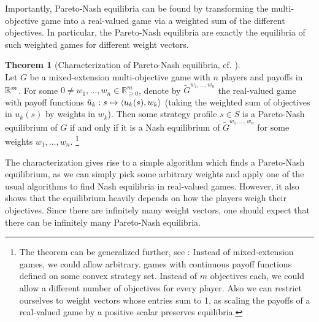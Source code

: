 \documentclass[a4paper]{scrreprt}
\newcommand{\Rp}{\mathbb{R}_{\geq 0}}
\theoremstyle{definition}
\newtheorem{thm}{Theorem}[chapter] %
\begin{document}
    Importantly, Pareto-Nash equilibria can be found by transforming the multi-objective game into a real-valued game via a weighted sum of the different objectives. In particular, the Pareto-Nash equilibria are exactly the equilibria of such weighted games for different weight vectors.
    
    \begin{thm}[Characterization of Pareto-Nash equilibria, cf. \cite{bib:shapleyMultiobjectiveEquilibriumPoints,bib:paretoNashEquilibria}]~\\
        Let $G$ be a mixed-extension multi-objective game with $n$ players and payoffs in $\mathbb{R}^m$. 
        For some $0 \neq w_1, \dots, w_n \in \Rp^m$, denote by $\tilde{G}^{w_1, \dots, w_n}$ the real-valued game with payoff functions
        $\tilde{u}_k: s \mapsto \left\langle u_k(s), w_k \right\rangle$ (taking the weighted sum of objectives in $u_k(s)$ by weights in $w_k$).
        Then some strategy profile $s \in S$ is a Pareto-Nash equilibrium of $G$ if and only if it is a Nash equilibrium of $\tilde{G}^{w_1, \dots, w_n}$ for some weights $w_1, \dots, w_n$.
        \footnote{The theorem can be generalized further, see \cite{bib:shapleyMultiobjectiveEquilibriumPoints,bib:paretoNashEquilibria}: Instead of mixed-extension games, we could allow arbitrary. games with continuous payoff functions defined on some convex strategy set.  Instead of $m$ objectives each, we could allow a different number of objectives for every player.
        Also we can restrict ourselves to weight vectors whose entries sum to 1, as scaling the payoffs of a real-valued game by a positive scalar preserves equilibria.
        }
        \label{thm:paretoNashEquilibriaWeightingCharacterization}
    \end{thm}

    The characterization gives rise to a simple algorithm which finds a Pareto-Nash equilibrium, as we can simply pick some arbitrary weights and apply one of the usual algorithms to find Nash equilibria in real-valued games.
    However, it also shows that the equilibrium heavily depends on how the players weigh their objectives. Since there are infinitely many weight vectors, one should expect that there can be infinitely many Pareto-Nash equilibria. 
    
\end{document}
